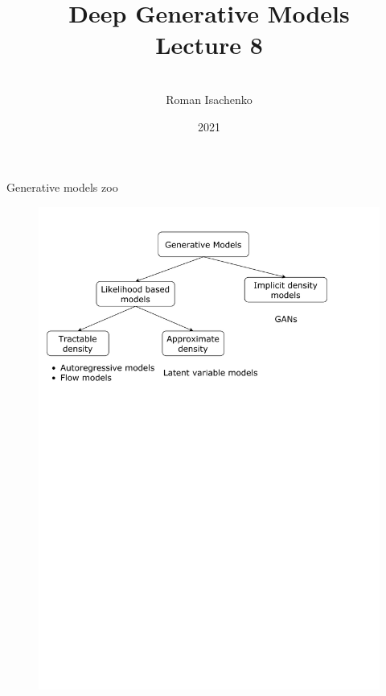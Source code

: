 \documentclass{beamer}
\title[\hbox to 56mm{Deep Generative Models  \hfill\insertframenumber\,/\,\inserttotalframenumber}]
{Deep Generative Models \\ Lecture 8}
\author[Roman Isachenko]{\\Roman Isachenko}
\institute[Ozon]{Ozon Masters \\
}
\date{2021}
\begin{document}
\begin{frame}
\titlepage
\end{frame}
\begin{frame}{Generative models zoo}
\begin{figure}
	\centering
	\includegraphics[width=1.0\linewidth]{figs/generative_models_zoo.pdf}
\end{figure}
\end{frame}
\end{document}
